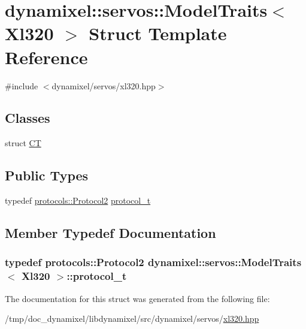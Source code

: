 \hypertarget{structdynamixel_1_1servos_1_1_model_traits_3_01_xl320_01_4}{}\section{dynamixel\+:\+:servos\+:\+:Model\+Traits$<$ Xl320 $>$ Struct Template Reference}
\label{structdynamixel_1_1servos_1_1_model_traits_3_01_xl320_01_4}


{\ttfamily \#include $<$dynamixel/servos/xl320.\+hpp$>$}

\subsection*{Classes}
\begin{DoxyCompactItemize}
\item 
struct \hyperlink{structdynamixel_1_1servos_1_1_model_traits_3_01_xl320_01_4_1_1_c_t}{C\+T}
\end{DoxyCompactItemize}
\subsection*{Public Types}
\begin{DoxyCompactItemize}
\item 
typedef \hyperlink{classdynamixel_1_1protocols_1_1_protocol2}{protocols\+::\+Protocol2} \hyperlink{structdynamixel_1_1servos_1_1_model_traits_3_01_xl320_01_4_a8d37bd76bd43745044dff497269f4520}{protocol\+\_\+t}
\end{DoxyCompactItemize}


\subsection{Member Typedef Documentation}
\hypertarget{structdynamixel_1_1servos_1_1_model_traits_3_01_xl320_01_4_a8d37bd76bd43745044dff497269f4520}{}
\subsubsection[{protocol\+\_\+t}]{\setlength{\rightskip}{0pt plus 5cm}typedef {\bf protocols\+::\+Protocol2} {\bf dynamixel\+::servos\+::\+Model\+Traits}$<$ {\bf Xl320} $>$\+::{\bf protocol\+\_\+t}}\label{structdynamixel_1_1servos_1_1_model_traits_3_01_xl320_01_4_a8d37bd76bd43745044dff497269f4520}


The documentation for this struct was generated from the following file\+:\begin{DoxyCompactItemize}
\item 
/tmp/doc\+\_\+dynamixel/libdynamixel/src/dynamixel/servos/\hyperlink{xl320_8hpp}{xl320.\+hpp}\end{DoxyCompactItemize}
